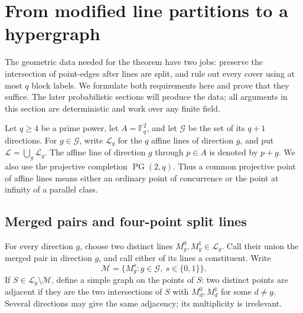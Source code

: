 \section{From modified line partitions to a hypergraph}
\label{sec:deterministic-construction}

The geometric data needed for the theorem have two jobs: preserve the
intersection of point-edges after lines are split, and rule out every
cover using at most $q$ block labels. We formulate both requirements here
and prove that they suffice. The later probabilistic sections will produce
the data; all arguments in this section are deterministic and work over
any finite field.

Let $q\geq4$ be a prime power, let $A=\mathbb F_q^2$, and let
$\mathcal G$ be the set of its $q+1$ directions.  For $g\in\mathcal G$,
write $\mathcal L_g$ for the $q$ affine lines of direction $g$, and put
$\mathcal L=\bigcup_g\mathcal L_g$.  The affine line of direction $g$
through $p\in A$ is denoted by $p+g$.  We also use the projective completion
$\operatorname{PG}(2,q)$.  Thus a common projective point of affine lines
means either an ordinary point of concurrence or the point at infinity of
a parallel class.

\subsection{Merged pairs and four-point split lines}

For every direction $g$, choose two distinct lines
$M_g^0,M_g^1\in\mathcal L_g$.  Call their union the merged pair in
direction $g$, and call either of its lines a constituent.  Write
\[
 \mathcal M=\{M_g^s:g\in\mathcal G,\ s\in\{0,1\}\}.
\]
If $S\in\mathcal L_g\setminus\mathcal M$, define a simple graph on the
points of $S$: two distinct points are adjacent if they are the two
intersections of $S$ with $M_d^0,M_d^1$ for some $d\ne g$.  Several
directions may give the same adjacency; its multiplicity is irrelevant.

